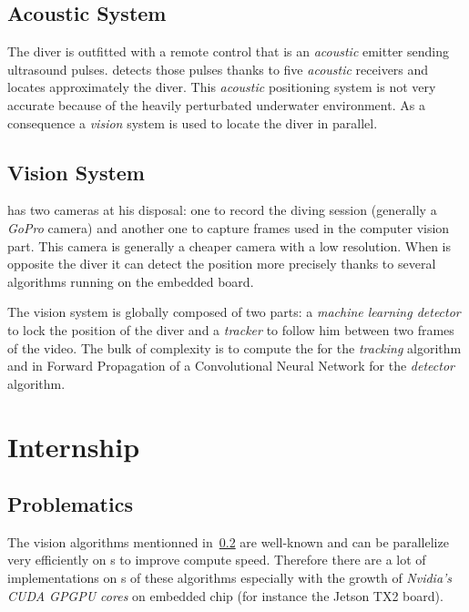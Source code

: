 \subsection{Acoustic System}

The diver is outfitted with a remote control that is an \emph{acoustic} emitter sending ultrasound pulses. \iBubble{} detects those pulses thanks to five \emph{acoustic} receivers and locates approximately the diver. This \emph{acoustic} positioning system is not very accurate because of the heavily perturbated underwater environment. As a consequence a \emph{vision} system is used to locate the diver in parallel.


\subsection{Vision System}

\label{Vision} %

\iBubble{} has two cameras at his disposal: one to record the diving session (generally a \emph{GoPro} camera) and another one to capture frames used in the computer vision part. This camera is generally a cheaper camera with a low resolution. When \iBubble{} is opposite the diver it can detect the position more precisely thanks to several algorithms running on the embedded board.

The vision system is globally composed of two parts: a \emph{machine learning detector} to lock the position of the diver and a \emph{tracker} to follow him between two frames of the video. The bulk of complexity is to compute the \flow{} for the \emph{tracking} algorithm and in Forward Propagation of a Convolutional Neural Network for the \emph{detector} algorithm.


\section{Internship}

\subsection{Problematics}

The vision algorithms mentionned in~\ref{Vision} are well-known and can be parallelize very efficiently on s to improve compute speed. Therefore there are a lot of implementations on s of these algorithms especially with the growth of \emph{Nvidia's CUDA GPGPU cores} on embedded chip (for instance the Jetson TX2 board).

